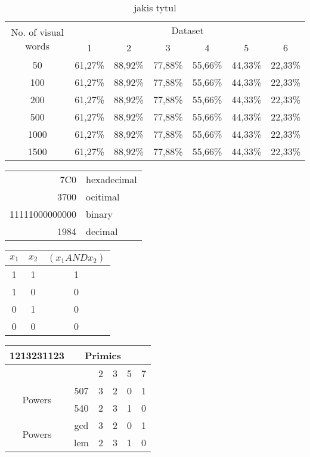 \documentclass{article}
\begin{document}
\begin{table}
	\centering
		\begin{tabular}{|c|c|c|c|c|c|c|}
	   \hline 
		\multirow{2}{*}{No. of visual words} & \multicolumn{6}{c|}{Dataset} \\ \cline{2-7}
		& 1 & 2 & 3 & 4 & 5 & 6 \\ \hline 
		50 & 61,27\% & 88,92\% & 77,88\% & 55,66\% & 44,33\% & 22,33\% \\ \hline
		100 & 61,27\% & 88,92\% & 77,88\% & 55,66\% & 44,33\% & 22,33\% \\ \hline
		200 & 61,27\% & 88,92\% & 77,88\% & 55,66\% & 44,33\% & 22,33\% \\ \hline
		500 & 61,27\% & 88,92\% & 77,88\% & 55,66\% & 44,33\% & 22,33\% \\ \hline
		1000 & 61,27\% & 88,92\% & 77,88\% & 55,66\% & 44,33\% & 22,33\% \\ \hline
		1500 & 61,27\% & 88,92\% & 77,88\% & 55,66\% & 44,33\% & 22,33\% \\ \hline
		\end{tabular}
	\caption{jakis tytul}
	\label{tab:asd}
\end{table}
	\begin{table}
		\centering
		\begin{tabular}{|r|l|}
		\hline
		7C0 & hexadecimal \\
		3700 & ocitimal \\ \cline{2-2}
		11111000000000 & binary \\ \hline \hline
		1984 & decimal \\
		\hline
			
		\end{tabular}
	\end{table}	
	\begin{table}
		\centering
			\begin{tabular}{c|c|c}
			\hline \hline
			$x_1$ & $x_2$ & $\left(x_1ANDx_2 \right)$ \\ \hline
			1 & 1 & 1 \\
			1 & 0 & 0 \\
			0 & 1 & 0 \\
			0 & 0 & 0 \\
			\hline \hline
			\end{tabular}
	\end{table}
	
	\begin{table}
		\centering
			\begin{tabular}{|c|c|c|c|c|c|}
			\hline
			  \multirow{2}{*}{1213231123} \multicolumn{2}{c|}{1} & \multicolumn{4}{c|}{Primics} \\  \hline
			  &   & 2 & 3 & 5 & 7 \\ \hline
				\multirow{2}{*}{Powers}& 507 & 3 & 2 & 0 & 1 \\ \cline{2-6}
				& 540 & 2 & 3 & 1 & 0 \\ \hline
				\multirow{2}{*}{Powers}& gcd & 3 & 2 & 0 & 1 \\ \cline{2-6}
				& lem & 2 & 3 & 1 & 0 \\ \hline
				
			\end{tabular}
	\end{table}
\end{document}

